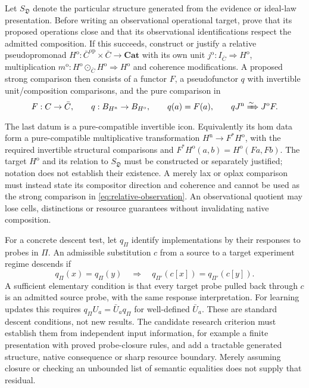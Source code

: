 \documentclass[11pt]{article}
\theoremstyle{remark}
\begin{document}
Let $S_{\mathfrak D}$ denote the particular structure generated from the evidence or ideal-law presentation. Before writing an observational operational target, prove that its proposed operations close and that its observational identifications respect the admitted composition. If this succeeds, construct or justify a relative pseudopromonad $H^{\mathrm o}:\bar C^{\mathrm{op}}\times\bar C\to\mathbf{Cat}$ with its own unit $j^{\mathrm o}:I_{\bar C}\Rightarrow H^{\mathrm o}$, multiplication $m^{\mathrm o}:H^{\mathrm o}\odot_{\bar C}H^{\mathrm o}\Rightarrow H^{\mathrm o}$ and coherence modifications. A proposed strong comparison then consists of a functor $F$, a pseudofunctor $q$ with invertible unit/composition comparisons, and the pure comparison in
\begin{equation}
 F:C\to\bar C,\qquad
 q:B_{H^{\mathrm n}}\to B_{H^{\mathrm o}},\qquad
 q(a)=F(a),\qquad qJ^{\mathrm n}\xRightarrow{\sim}J^{\mathrm o}F.
 \label{eq:relative-observation}
\end{equation}
The last datum is a pure-compatible invertible icon. Equivalently its hom data form a pure-compatible multiplicative transformation $H^{\mathrm n}\to F^*H^{\mathrm o}$, with the required invertible structural comparisons and $F^*H^{\mathrm o}(a,b)=H^{\mathrm o}(Fa,Fb)$. The target $H^{\mathrm o}$ and its relation to $S_{\mathfrak D}$ must be constructed or separately justified; notation does not establish their existence. A merely lax or oplax comparison must instead state its compositor direction and coherence and cannot be used as the strong comparison in \eqref{eq:relative-observation}. An observational quotient may lose cells, distinctions or resource guarantees without invalidating native composition.

For a concrete descent test, let $q_\Pi$ identify implementations by their responses to probes in $\Pi$. An admissible substitution $c$ from a source to a target experiment regime descends if
\[
 q_\Pi(x)=q_\Pi(y)\quad\Longrightarrow\quad
 q_{\Pi'}(c[x])=q_{\Pi'}(c[y]).
\]
A sufficient elementary condition is that every target probe pulled back through $c$ is an admitted source probe, with the same response interpretation. For learning updates this requires $q_\Pi U_a=\bar U_a q_\Pi$ for well-defined $\bar U_a$. These are standard descent conditions, not new results. The candidate research criterion must establish them from independent input information, for example a finite presentation with proved probe-closure rules, and add a tractable generated structure, native consequence or sharp resource boundary. Merely assuming closure or checking an unbounded list of semantic equalities does not supply that residual.
\end{document}
